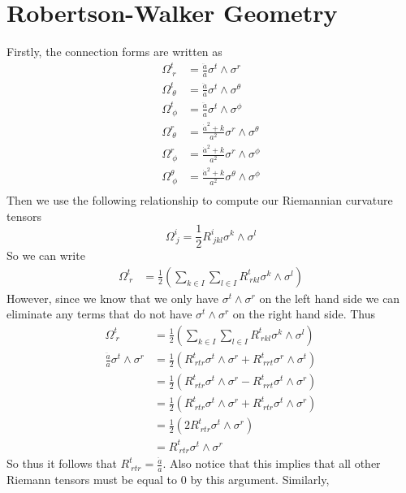 \documentclass{article}
\theoremstyle{definition}
\begin{document}
\section{Robertson-Walker Geometry}
Firstly, the connection forms are written as
\begin{align*}
    \Omega^t_{\ r} &= \frac{\ddot a}{a}\sigma^t \wedge \sigma^r \\
    \Omega^t_{\ \theta} &= \frac{\ddot a}{a}\sigma^t \wedge \sigma^\theta \\
    \Omega^t_{\ \phi} &= \frac{\ddot a}{a}\sigma^t \wedge \sigma^\phi \\
    \Omega^r_{\ \theta} &= \frac{\dot a^2+k}{a^2}\sigma^r \wedge \sigma^\theta \\
    \Omega^r_{\ \phi} &= \frac{\dot a^2 + k}{a^2}\sigma^r \wedge \sigma^\phi \\
    \Omega^\theta_{\ \phi} &= \frac{\dot a^2 + k}{a^2}\sigma^\theta \wedge \sigma^\phi \\
\end{align*}
Then we use the following relationship to compute our Riemannian curvature tensors
\[
    \Omega^i_{\ j} = \frac{1}{2}R^i_{\ jkl}\sigma^k \wedge \sigma^l
\]
So we can write 
\begin{align*}
    \Omega^t_{\ r} &= \frac{1}{2} \left(\sum_{k \in I}\sum_{l \in I}R^t_{\ rkl}\sigma^k \wedge \sigma^l\right)
\end{align*}
However, since we know that we only have $\sigma^t \wedge \sigma^r$ on the left hand side we can eliminate any terms that 
do not have $\sigma^t \wedge \sigma^r$ on the right hand side. Thus 
\begin{align*}
    \Omega^t_{\ r} &= \frac{1}{2} \left(\sum_{k \in I}\sum_{l \in I}R^t_{\ rkl}\sigma^k \wedge \sigma^l\right) \\
    \frac{\ddot a}{a}\sigma^t \wedge \sigma^r &= \frac{1}{2}\left(R^t_{\ rtr}\sigma^t \wedge \sigma^r + R^t_{\ rrt}\sigma^r \wedge \sigma^t\right)\\
    &= \frac{1}{2}\left(R^t_{\ rtr}\sigma^t \wedge \sigma^r - R^t_{\ rrt}\sigma^t \wedge \sigma^r\right)\\
    &= \frac{1}{2}\left(R^t_{\ rtr}\sigma^t \wedge \sigma^r + R^t_{\ rtr}\sigma^t \wedge \sigma^r\right)\\
    &= \frac{1}{2}\left(2 R^t_{\ rtr}\sigma^t \wedge \sigma^r\right)\\
    &= R^t_{\ rtr} \sigma^t \wedge \sigma^r
\end{align*}
So thus it follows that $R^t_{\ rtr} = \frac{\ddot a}{a}$. Also notice that this implies that all other Riemann tensors must be equal to 0 by this argument. Similarly,
\end{document}
